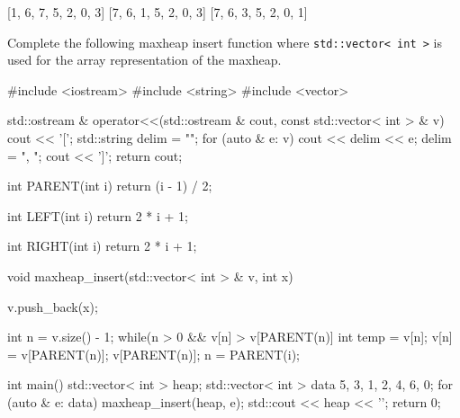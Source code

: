 \ANSWER
\begin{answercode}
[10, 6, 7, 5, 2, 0, 3, 1]

[1, 6, 7, 5, 2, 0, 3]
[7, 6, 1, 5, 2, 0, 3]
[7, 6, 3, 5, 2, 0, 1]
\end{answercode}

\nextq
Complete the following maxheap insert function where \verb!std::vector< int >!
is used for the array representation of the maxheap.

\ANSWER
\begin{answercode}
#include <iostream>
#include <string>
#include <vector>

std::ostream & operator<<(std::ostream & cout, const std::vector< int > & v)
{
    cout << '[';
    std::string delim = "";
    for (auto & e: v)
    {
        cout << delim << e; delim = ", ";
    }
    cout << ']';
    return cout;
}

int PARENT(int i)
{
  return (i - 1) / 2;
}

int LEFT(int i)
{
  return 2 * i + 1;
}

int RIGHT(int i)
{
  return 2 * i + 1;
}

void maxheap_insert(std::vector< int > & v, int x)
{
  v.push_back(x);

  int n = v.size() - 1;
  while(n > 0 && v[n] > v[PARENT(n)]
  {
    int temp = v[n];
    v[n] = v[PARENT(n)];
    v[PARENT(n)];
    n = PARENT(i);
  }
}

int main()
{
    std::vector< int > heap;
    std::vector< int > data {5, 3, 1, 2, 4, 6, 0};
    for (auto & e: data)
    {
        maxheap_insert(heap, e);
        std::cout << heap << '\n';
    }
    return 0;
}
\end{answercode}


